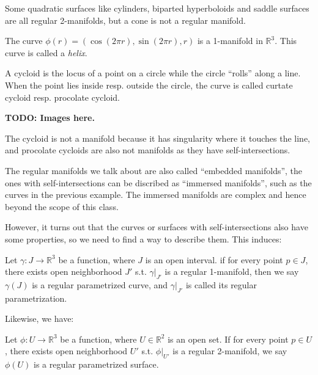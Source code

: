 \begin{example}
    Some quadratic surfaces like cylinders, biparted hyperboloids and saddle surfaces
	are all regular 2-manifolds, but a cone is not a regular manifold.
\end{example}
\begin{example}
    The curve $\phi(r) = (\cos(2\pi r), \sin (2\pi r), r)$ is a 1-manifold in $\mathbb{R}^3$.
	This curve is called a \textit{helix}.
\end{example}
\begin{example}[Cycloid]
    A cycloid is the locus of a point on a circle while the circle ``rolls'' along a line.
	When the point lies inside resp. outside the circle, the curve is called
	curtate cycloid resp. procolate cycloid.

	{\bfseries TODO: Images here.}

	The cycloid is not a manifold because it has singularity where it touches the line,
	and procolate cycloids are also not manifolds as they have self-intersections.
\end{example}
\begin{remark}
    The regular manifolds we talk about are also called ``embedded manifolds'',
	the ones with self-intersections can be discribed as ``immersed manifolds'',
	such as the curves in the previous example. The immersed manifolds are complex
	and hence beyond the scope of this class.
\end{remark}

However, it turns out that the curves or surfaces with self-intersections also have some
properties, so we need to find a way to describe them. This induces:

\begin{definition}
	Let $\gamma: J\to \mathbb{R}^3$ be a function, where $J$ is an open interval.
	if for every point $p\in J$, there exists open neighborhood  $J'$ s.t.
	$\gamma\big|_{J'}$ is a regular 1-manifold, then we say $\gamma(J)$
	is a regular parametrized curve, and  $\gamma\big|_{J'}$ is
	called its regular parametrization.
\end{definition}
Likewise, we have:
\begin{definition}
	Let $\phi:U\to \mathbb{R}^3$ be a function, where $U\in \mathbb{R}^2$ is an open set.
	If for every point $p\in U$, there exists open neighborhood  $U'$ s.t.
	$\phi\big|_{U'}$ is a regular 2-manifold, we say $\phi(U)$ is
	a regular parametrized surface.
\end{definition}

